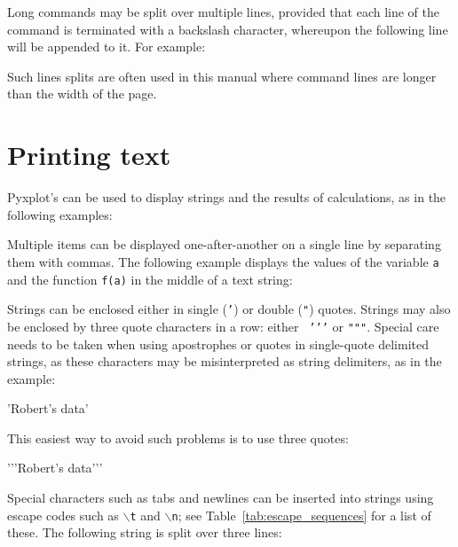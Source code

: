 Long commands may be split over multiple lines, provided that each line of the
command is terminated with a backslash character, whereupon the following line
will be appended to it. For example:

\vspace{3mm}

\vspace{3mm}

\noindent Such lines splits are often used in this manual where command lines
are longer than the width of the page.

\section{Printing text}

Pyxplot's  can be used to display strings and the results of
calculations, as in the following examples:

\vspace{3mm}

\vspace{3mm}

Multiple items can be displayed one-after-another on a single line by
separating them with commas. The following example displays the values of the
variable {\tt a} and the function {\tt f(a)} in the middle of a text string:

\vspace{3mm}

\vspace{3mm}

Strings can be enclosed either in single ({\tt '}) or double ({\tt "}) quotes.
Strings may also be enclosed by three quote characters in a row: either {\tt
\textquoteright\textquoteright\textquoteright} or {\tt """}. Special care needs
to be taken when using apostrophes or quotes in single-quote delimited strings,
as these characters may be misinterpreted as string delimiters, as in the
example:

\begin{dontdo}
'Robert's data'
\end{dontdo}

\noindent This easiest way to avoid such problems is to use three quotes:

\begin{dodo}
\textquoteright\textquoteright\textquoteright Robert's data\textquoteright\textquoteright\textquoteright
\end{dodo}

Special characters such as tabs and newlines can be inserted into strings using
escape codes such as {\tt $\backslash$t} and {\tt $\backslash$n}; see
Table~\ref{tab:escape_sequences} for a list of these. The following string is
split over three lines:

